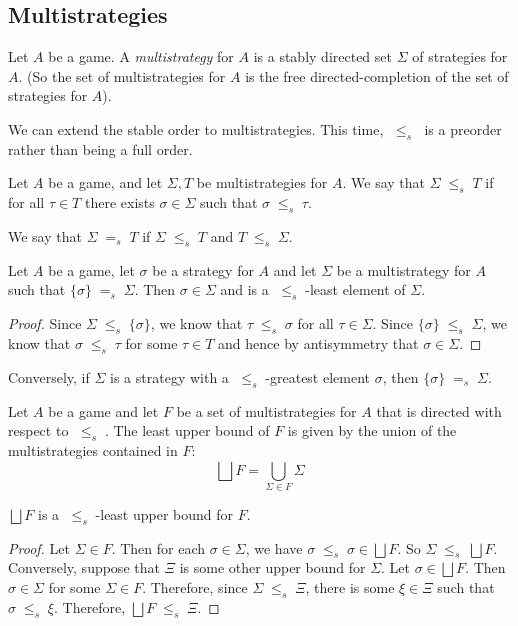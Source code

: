 \documentclass{entcs} \usepackage{prentcsmacro}
\newcommand{\stle}{{\;\le_s\;}}
\newcommand{\steq}{{\;=_s\;}}
\newcommand{\exlub}{\bigsqcup}
\newcommand{\0}{{\mathtt{0}}}
\newcommand{\Tau}{T}
\begin{document}
\subsection{Multistrategies}

\begin{definition}
  Let $A$ be a game.  A \emph{multistrategy} for $A$ is a stably directed set $\Sigma$ of strategies for $A$.  (So the set of multistrategies for $A$ is the free directed-completion of the set of strategies for $A$).

  We can extend the stable order to multistrategies.  This time, $\stle$ is a preorder rather than being a full order.

  Let $A$ be a game, and let $\Sigma,\Tau$ be multistrategies for $A$.  We say that $\Sigma\stle\Tau$ if for all $\tau\in\Tau$ there exists $\sigma\in\Sigma$ such that $\sigma\stle\tau$.

  We say that $\Sigma \steq \Tau$ if $\Sigma\stle\Tau$ and $\Tau\stle\Sigma$.
\end{definition}

\begin{lemma}
  Let $A$ be a game, let $\sigma$ be a strategy for $A$ and let $\Sigma$ be a multistrategy for $A$ such that $\{\sigma\}\steq\Sigma$.  Then $\sigma\in\Sigma$ and is a $\stle$-least element of $\Sigma$.
\end{lemma}
  \begin{proof}
    Since $\Sigma\stle\{\sigma\}$, we know that $\tau\stle\sigma$ for all $\tau\in\Sigma$.  Since $\{\sigma\}\stle\Sigma$, we know that $\sigma\stle\tau$ for some $\tau\in\Tau$ and hence by antisymmetry that $\sigma\in\Sigma$.
  \end{proof}

Conversely, if $\Sigma$ is a strategy with a $\stle$-greatest element $\sigma$, then $\{\sigma\}\steq\Sigma$.

\begin{definition}
  Let $A$ be a game and let $F$ be a set of multistrategies for $A$ that is directed with respect to $\stle$.  The least upper bound of $F$ is given by the union of the multistrategies contained in $F$:
  \[
    \exlub F = \bigcup_{\Sigma\in F}\Sigma
    \]
\end{definition}

\begin{proposition}
  \label{multiExlubIsStlub}
  $\exlub F$ is a $\stle$-least upper bound for $F$.

\end{proposition}
  \begin{proof}
    Let $\Sigma\in F$.  Then for each $\sigma\in\Sigma$, we have $\sigma\stle\sigma\in \exlub F$.  So $\Sigma\stle\exlub F$.  Conversely, suppose that $\Xi$ is some other upper bound for $\Sigma$.  Let $\sigma\in \exlub F$.  Then $\sigma\in \Sigma$ for some $\Sigma\in F$.  Therefore, since $\Sigma\stle\Xi$, there is some $\xi\in \Xi$ such that $\sigma\stle\xi$.  Therefore, $\exlub F\stle\Xi$.
  \end{proof}
\end{document}
